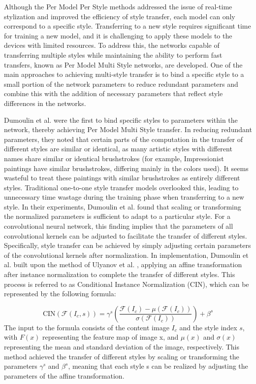 \documentclass[preprint,12pt]{elsarticle}
\begin{document}
Although the Per Model Per Style methods addressed the issue of real-time stylization and improved the efficiency of style transfer, each model can only correspond to a specific style. Transferring to a new style requires significant time for training a new model, and it is challenging to apply these models to the devices with limited resources. To address this, the networks capable of transferring multiple styles while maintaining the ability to perform fast transfers, known as Per Model Multi Style networks, are developed. One of the main approaches to achieving multi-style transfer is to bind a specific style to a small portion of the network parameters to reduce redundant parameters and combine this with the addition of necessary parameters that reflect style differences in the networks.

Dumoulin et al.\citep{39dumoulin2016learned} were the first to bind specific styles to parameters within the network, thereby achieving Per Model Multi Style transfer. In reducing redundant parameters, they noted that certain parts of the computation in the transfer of different styles are similar or identical, as many artistic styles with different names share similar or identical brushstrokes (for example, Impressionist paintings have similar brushstrokes, differing mainly in the colors used). It seems wasteful to treat these paintings with similar brushstrokes as entirely different styles. Traditional one-to-one style transfer models overlooked this, leading to unnecessary time wastage during the training phase when transferring to a new style.
In their experiments, Dumoulin et al.\citep{39dumoulin2016learned} found that scaling or transforming the normalized parameters is sufficient to adapt to a particular style. For a convolutional neural network, this finding implies that the parameters of all convolutional kernels can be adjusted to facilitate the transfer of different styles. Specifically, style transfer can be achieved by simply adjusting certain parameters of the convolutional kernels after normalization. In implementation, Dumoulin et al.\citep{39dumoulin2016learned} built upon the method of Ulyanov et al. \citep{23ulyanov2016texture}, applying an affine transformation after instance normalization to complete the transfer of different styles. This process is referred to as Conditional Instance Normalization (CIN), which can be represented by the following formula:

\begin{equation}
    \label{IN}
    \text{CIN}\left(\mathcal{F}(I_c,s)\right) = \gamma^s\left(\frac{\mathcal{F}(I_c)-\mu(\mathcal{F}(I_c))}{\sigma(\mathcal{F}(I_c))}\right)+\beta^s
\end{equation}
The input to the formula consists of the content image $I_c$ and the style index $s$, with $F(x)$ representing the feature map of image x, and $\mu(x)$ and $\sigma(x)$ representing the mean and standard deviation of the image, respectively. This method achieved the transfer of different styles by scaling or transforming the parameters $\gamma^s$ and $\beta^s$, meaning that each style s can be realized by adjusting the parameters of the affine transformation.
\end{document}
